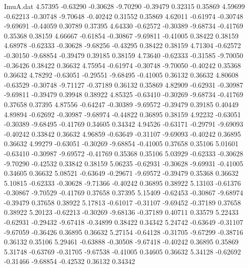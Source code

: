 \begin{filecontents}{ImuA.dat}
   4.57395   -0.63290   -0.30628   -9.70290   -0.39479    0.32315    0.35869
   4.59699   -0.62213   -0.30748   -9.70648   -0.40242    0.31552    0.35869
   4.62011   -0.61974   -0.30748   -9.69691   -0.44059    0.30789    0.37395
   4.64330   -0.62572   -0.30389   -9.68734   -0.41769    0.35368    0.38159
   4.66667   -0.61854   -0.30867   -9.69811   -0.41005    0.38422    0.38159
   4.68978   -0.62333   -0.30628   -9.68256   -0.43295    0.38422    0.38159
   4.71304   -0.62572   -0.30150   -9.68854   -0.39479    0.39185    0.38159
   4.73640   -0.62333   -0.31585   -9.70050   -0.36426    0.38422    0.36632
   4.75954   -0.61974   -0.30748   -9.70050   -0.40242    0.35368    0.36632
   4.78292   -0.63051   -0.29551   -9.68495   -0.41005    0.36132    0.36632
   4.80608   -0.63529   -0.30748   -9.71127   -0.37189    0.36132    0.35869
   4.82909   -0.62931   -0.30987   -9.69811   -0.39479    0.39948    0.38922
   4.85325   -0.63410   -0.30269   -9.68734   -0.41769    0.37658    0.37395
   4.87556   -0.64247   -0.30389   -9.69572   -0.39479    0.39185    0.40449
   4.89894   -0.62692   -0.30987   -9.68974   -0.44822    0.36895    0.38159
   4.92232   -0.63051   -0.30389   -9.68495   -0.41769    0.34605    0.34342
   4.94526   -0.63171   -0.29791   -9.69093   -0.40242    0.33842    0.36632
   4.96859   -0.63649   -0.31107   -9.69093   -0.40242    0.36895    0.36632
   4.99279   -0.63051   -0.30269   -9.68854   -0.41005    0.37658    0.35106
   5.01601   -0.63410   -0.30987   -9.69572   -0.41769    0.35368    0.35106
   5.03929   -0.62333   -0.30628   -9.70290   -0.42532    0.33842    0.38159
   5.06235   -0.62931   -0.30628   -9.69931   -0.41005    0.34605    0.36632
   5.08521   -0.63649   -0.29671   -9.69572   -0.39479    0.35368    0.36632
   5.10815   -0.62333   -0.30628   -9.71366   -0.40242    0.36895    0.38922
   5.13103   -0.61376   -0.30867   -9.70529   -0.41769    0.37658    0.37395
   5.15409   -0.62453   -0.30867   -9.68974   -0.39479    0.37658    0.38922
   5.17813   -0.61017   -0.31107   -9.69452   -0.37189    0.37658    0.38922
   5.20123   -0.62213   -0.30269   -9.68136   -0.37189    0.40711    0.33579
   5.22433   -0.62931   -0.29432   -9.67418   -0.34899    0.38422    0.34342
   5.24742   -0.63649   -0.31107   -9.67059   -0.36426    0.36895    0.36632
   5.27154   -0.64128   -0.31705   -9.67299   -0.38716    0.36132    0.35106
   5.29461   -0.63888   -0.30508   -9.67418   -0.40242    0.36895    0.35869
   5.31748   -0.63769   -0.31705   -9.67538   -0.41005    0.34605    0.36632
   5.34128   -0.62692   -0.31466   -9.68854   -0.42532    0.36132    0.34342

\end{filecontents}
